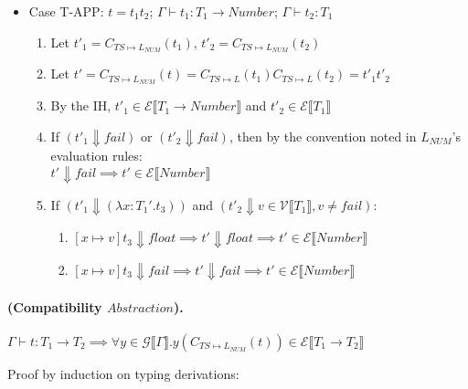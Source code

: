 \documentclass{article}
\newcommand{\denoteset}[2]{\mathcal{#1} \llbracket #2 \rrbracket}
\begin{document}
\begin{itemize}
		\item Case T-APP: $t = t_1 t_2$; $\Gamma \vdash t_1: T_1 \rightarrow Number$; $\Gamma \vdash t_2: T_1$
		\begin{enumerate}
			\item Let $t'_1 = C_{TS \mapsto L_{NUM}}(t_1)$, $t'_2 = C_{TS \mapsto L_{NUM}}(t_2)$
			\item Let $t' = C_{TS \mapsto L_{NUM}}(t) = C_{TS \mapsto L}(t_1) C_{TS \mapsto L}(t_2) = t'_1 t'_2$
			\item By the IH, $t'_1 \in \denoteset{E}{T_1 \rightarrow Number}$ and $t'_2 \in \denoteset{E}{T_1}$
			\item If $(t'_1 \Downarrow fail)$ or $(t'_2 \Downarrow fail)$, then by the convention noted in $L_{NUM}$'s evaluation rules:\\
			$t' \Downarrow fail \implies t' \in \denoteset{E}{Number}$
			\item If $(t'_1 \Downarrow (\lambda x: T_1'.t_3))$ and $(t'_2 \Downarrow v \in \denoteset{V}{T_1}, v \neq fail)$:\\
			\begin{enumerate}
				\item $[x \mapsto v]t_3 \Downarrow float \implies t' \Downarrow float \implies t' \in \denoteset{E}{Number}$
				\item $[x \mapsto v]t_3 \Downarrow fail \implies t' \Downarrow fail \implies t' \in \denoteset{E}{Number}$
			\end{enumerate}

		\end{enumerate}
	\end{itemize}

	\paragraph{(Compatibility $Abstraction$).}
	$\Gamma \vdash t: T_1 \rightarrow T_2 \implies \forall y \in \denoteset{G}{\Gamma}. y(C_{TS \mapsto L_{NUM}}(t)) \in \denoteset{E}{T_1 \rightarrow T_2}$

	Proof by induction on typing derivations:
	
\end{document}
